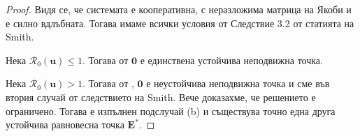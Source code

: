 \begin{proof}
  Видя се, че системата е кооперативна, с неразложима матрица на Якоби и е силно вдлъбната. Тогава имаме всички условия от Следствие 3.2 от статията \cite{Smith1986} на Smith.

  Нека $\mathscr{R}_0(\mathbf{u}) \leq 1$. Тогава от \cite{Driessche2002} $\mathbf{0}$ е единствена устойчива неподвижна точка.

  Нека $\mathscr{R}_0(\mathbf{u}) > 1$. Тогава от \cite{Driessche2002}, $\mathbf{0}$ е неустойчива неподвижна точка и сме във втория случай от следствието на Smith. Вече доказахме, че решението е ограничено. Тогава е изпълнен подслучай (b) и съществува точно една друга устойчива равновесна точка $\mathbf{E}^*$.

\end{proof}


